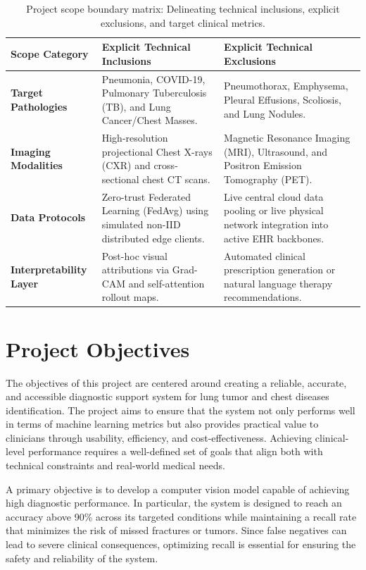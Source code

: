 \begin{table}[htbp]
	\centering
	\caption{Project scope boundary matrix: Delineating technical inclusions, explicit exclusions, and target clinical metrics.}
	\label{tab:project_scope_matrix}
	\small
	\begin{tabularx}{\textwidth}{lXX}
		\toprule
		\textbf{Scope Category} & \textbf{Explicit Technical Inclusions} & \textbf{Explicit Technical Exclusions} \\
		\midrule
		\textbf{Target Pathologies} & Pneumonia, COVID-19, Pulmonary Tuberculosis (TB), and Lung Cancer/Chest Masses. & Pneumothorax, Emphysema, Pleural Effusions, Scoliosis, and Lung Nodules. \\
		\addlinespace
		\textbf{Imaging Modalities} & High-resolution projectional Chest X-rays (CXR) and cross-sectional chest CT scans. & Magnetic Resonance Imaging (MRI), Ultrasound, and Positron Emission Tomography (PET). \\
		\addlinespace
		\textbf{Data Protocols} & Zero-trust Federated Learning (FedAvg) using simulated non-IID distributed edge clients. & Live central cloud data pooling or live physical network integration into active EHR backbones. \\
		\addlinespace
		\textbf{Interpretability Layer} & Post-hoc visual attributions via Grad-CAM and self-attention rollout maps. & Automated clinical prescription generation or natural language therapy recommendations. \\
		\bottomrule
	\end{tabularx}
\end{table}

\section{Project Objectives} \label{sec:objectives}

The objectives of this project are centered around creating a reliable, accurate, and accessible diagnostic support system for lung tumor and chest diseases identification. The project aims to ensure that the system not only performs well in terms of machine learning metrics but also provides practical value to clinicians through usability, efficiency, and cost-effectiveness. Achieving clinical-level performance requires a well-defined set of goals that align both with technical constraints and real-world medical needs.

A primary objective is to develop a computer vision model capable of achieving high diagnostic performance. In particular, the system is designed to reach an accuracy above 90\% across its targeted conditions while maintaining a recall rate that minimizes the risk of missed fractures or tumors. Since false negatives can lead to severe clinical consequences, optimizing recall is essential for ensuring the safety and reliability of the system.

